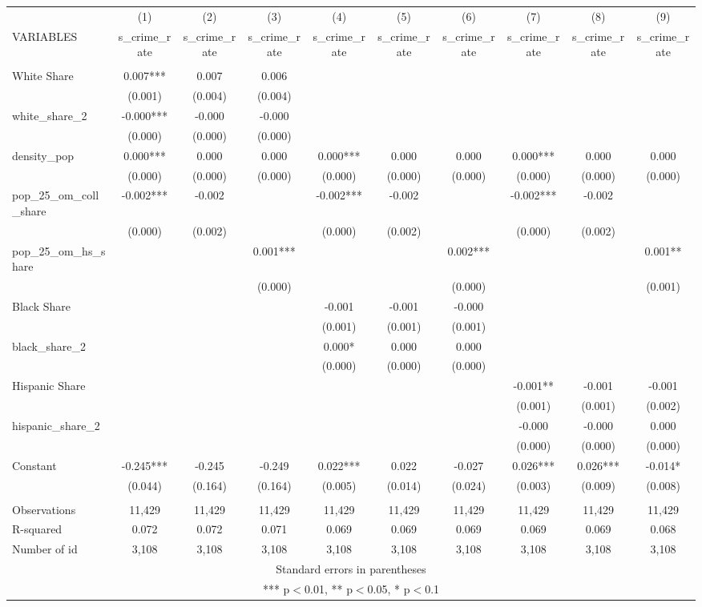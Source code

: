 \documentclass[]{article}
\begin{document}
\begin{tabular}{lccccccccc} \hline
 & (1) & (2) & (3) & (4) & (5) & (6) & (7) & (8) & (9) \\
VARIABLES & s\_crime\_rate & s\_crime\_rate & s\_crime\_rate & s\_crime\_rate & s\_crime\_rate & s\_crime\_rate & s\_crime\_rate & s\_crime\_rate & s\_crime\_rate \\ \hline
 &  &  &  &  &  &  &  &  &  \\
White Share & 0.007*** & 0.007 & 0.006 &  &  &  &  &  &  \\
 & (0.001) & (0.004) & (0.004) &  &  &  &  &  &  \\
white\_share\_2 & -0.000*** & -0.000 & -0.000 &  &  &  &  &  &  \\
 & (0.000) & (0.000) & (0.000) &  &  &  &  &  &  \\
density\_pop & 0.000*** & 0.000 & 0.000 & 0.000*** & 0.000 & 0.000 & 0.000*** & 0.000 & 0.000 \\
 & (0.000) & (0.000) & (0.000) & (0.000) & (0.000) & (0.000) & (0.000) & (0.000) & (0.000) \\
pop\_25\_om\_coll\_share & -0.002*** & -0.002 &  & -0.002*** & -0.002 &  & -0.002*** & -0.002 &  \\
 & (0.000) & (0.002) &  & (0.000) & (0.002) &  & (0.000) & (0.002) &  \\
pop\_25\_om\_hs\_share &  &  & 0.001*** &  &  & 0.002*** &  &  & 0.001** \\
 &  &  & (0.000) &  &  & (0.000) &  &  & (0.001) \\
Black Share &  &  &  & -0.001 & -0.001 & -0.000 &  &  &  \\
 &  &  &  & (0.001) & (0.001) & (0.001) &  &  &  \\
black\_share\_2 &  &  &  & 0.000* & 0.000 & 0.000 &  &  &  \\
 &  &  &  & (0.000) & (0.000) & (0.000) &  &  &  \\
Hispanic Share &  &  &  &  &  &  & -0.001** & -0.001 & -0.001 \\
 &  &  &  &  &  &  & (0.001) & (0.001) & (0.002) \\
hispanic\_share\_2 &  &  &  &  &  &  & -0.000 & -0.000 & 0.000 \\
 &  &  &  &  &  &  & (0.000) & (0.000) & (0.000) \\
Constant & -0.245*** & -0.245 & -0.249 & 0.022*** & 0.022 & -0.027 & 0.026*** & 0.026*** & -0.014* \\
 & (0.044) & (0.164) & (0.164) & (0.005) & (0.014) & (0.024) & (0.003) & (0.009) & (0.008) \\
 &  &  &  &  &  &  &  &  &  \\
Observations & 11,429 & 11,429 & 11,429 & 11,429 & 11,429 & 11,429 & 11,429 & 11,429 & 11,429 \\
R-squared & 0.072 & 0.072 & 0.071 & 0.069 & 0.069 & 0.069 & 0.069 & 0.069 & 0.068 \\
 Number of id & 3,108 & 3,108 & 3,108 & 3,108 & 3,108 & 3,108 & 3,108 & 3,108 & 3,108 \\ \hline
\multicolumn{10}{c}{ Standard errors in parentheses} \\
\multicolumn{10}{c}{ *** p$<$0.01, ** p$<$0.05, * p$<$0.1} \\
\end{tabular}
\end{document}
